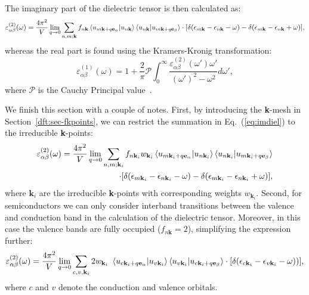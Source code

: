 \begin{refsection}
\begin{equation}
\end{equation}
The imaginary part of the dielectric tensor is then calculated as:
\begin{equation}\label{eq:imdiel}
\varepsilon_{\alpha \beta}^{(2)} (\omega) = \frac{4\pi^2}{V} \lim_{q \rightarrow 0} \sum_{n,m;\mathbf{k}} f_{n\mathbf{k}} \braket{u_{m\mathbf{k}+q\mathbf{e}_\alpha}|u_{n\mathbf{k}}} \braket{u_{n\mathbf{k}}|u_{m\mathbf{k}+q\mathbf{e}_\beta}} \cdot [\delta(\epsilon_{m\mathbf{k}}-\epsilon_{n\mathbf{k}}-\omega) - \delta(\epsilon_{m\mathbf{k}}-\epsilon_{n\mathbf{k}}+\omega)],
\end{equation}
whereas the real part is found using the Kramers-Kronig transformation:
\begin{equation}
\varepsilon_{\alpha \beta}^{(1)} (\omega) = 1 + \frac{2}{\pi} \mathcal{P} \int_0^\infty \frac{\varepsilon_{\alpha \beta}^{(2)} (\omega')\omega'}{(\omega')^2 - \omega^2}d\omega',
\end{equation}
where $\mathcal{P}$ is the Cauchy Principal value~\cite{Gogolin2014}. 

We finish this section with a couple of notes. First, by introducing the \textbf{k}-mesh in Section~\ref{dft:sec-fkpoints}, we can restrict the summation in Eq.~(\ref{eq:imdiel}) to the irreducible \textbf{k}-points:
\begin{align*}
\varepsilon_{\alpha \beta}^{(2)} (\omega) = \frac{4\pi^2}{V} \lim_{q \rightarrow 0} \sum_{n,m;\mathbf{k}_i}  f_{n\mathbf{k}_i} w_{\mathbf{k}_i} \braket{u_{m\mathbf{k}_i+q\mathbf{e}_\alpha}|u_{n\mathbf{k}_i}} \braket{u_{n\mathbf{k}_i}|u_{m\mathbf{k}_i+q\mathbf{e}_\beta}} \\ 
\cdot [\delta(\epsilon_{m\mathbf{k}_i}-\epsilon_{n\mathbf{k}_i}-\omega) - \delta(\epsilon_{m\mathbf{k}_i}-\epsilon_{n\mathbf{k}_i}+\omega)],
\end{align*}
where $\mathbf{k}_i$ are the irreducible \textbf{k}-points with corresponding weights $w_{\mathbf{k}_i}$. Second, for semiconductors we can only consider interband transitions between the valence and conduction band in the calculation of the dielectric tensor. Moreover, in this case the valence bands are fully occupied ($f_{n\mathbf{k}} = 2$), simplifying the expression further:
\begin{equation}
\varepsilon_{\alpha \beta}^{(2)} (\omega) = \frac{4\pi^2}{V} \lim_{q \rightarrow 0} \sum_{c,v,\mathbf{k}_i} 2 w_{\mathbf{k}_i} \ \braket{u_{c\mathbf{k}_i+q\mathbf{e}_\alpha}|u_{v\mathbf{k}_i}} \braket{u_{v\mathbf{k}_i}|u_{c\mathbf{k}_i+q\mathbf{e}_\beta}} \cdot [\delta(\epsilon_{c\mathbf{k}_i}-\epsilon_{v\mathbf{k}_i}-\omega))],
\end{equation}
where $c$ and $v$ denote the conduction and valence orbitals.


\end{refsection}
